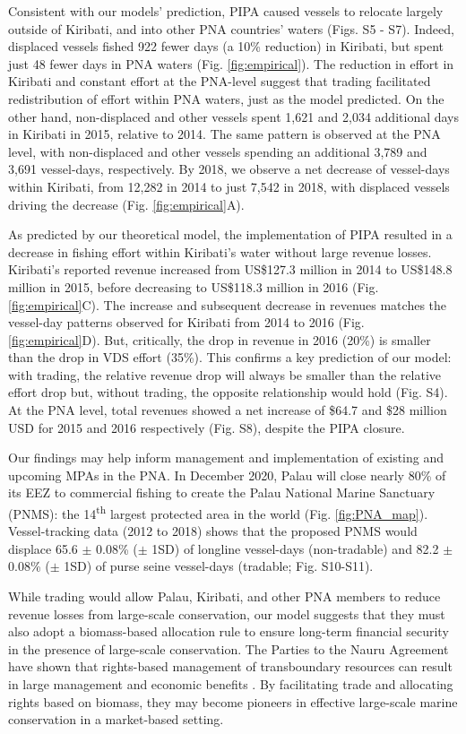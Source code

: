 \documentclass[12pt]{article}
\begin{document}
Consistent with our models' prediction, PIPA caused vessels to relocate largely outside of Kiribati, and into other PNA countries' waters (Figs. S5 - S7). Indeed, displaced vessels fished 922 fewer days (a 10\% reduction) in Kiribati, but spent just 48 fewer days in PNA waters (Fig. \ref{fig:empirical}).  The reduction in effort in Kiribati and constant effort at the PNA-level suggest that trading facilitated redistribution of effort within PNA waters, just as the model predicted. On the other hand, non-displaced and other vessels spent 1,621 and 2,034 additional days in Kiribati in 2015, relative to 2014. The same pattern is observed at the PNA level, with non-displaced and other vessels spending an additional 3,789 and 3,691 vessel-days, respectively. By 2018, we observe a net decrease of vessel-days within Kiribati, from 12,282 in 2014 to just 7,542 in 2018, with displaced vessels driving the decrease (Fig. \ref{fig:empirical}A).

As predicted by our theoretical model, the implementation of PIPA resulted in a decrease in fishing effort within Kiribati's water without large revenue losses. Kiribati's reported revenue increased from US\$127.3 million in 2014 to US\$148.8 million in 2015, before decreasing to US\$118.3 million in 2016 (Fig. \ref{fig:empirical}C). The increase and subsequent decrease in revenues matches the vessel-day patterns observed for Kiribati from 2014 to 2016 (Fig. \ref{fig:empirical}D). But, critically, the drop in revenue in 2016 (20\%) is smaller than the drop in VDS effort (35\%). This confirms a key prediction of our model: with trading, the relative revenue drop will always be smaller than the relative effort drop but, without trading, the opposite relationship would hold (Fig. S4). At the PNA level, total revenues showed a net increase of \$64.7 and \$28 million USD for 2015 and 2016 respectively (Fig. S8), despite the PIPA closure.

Our findings may help inform management and implementation of existing and upcoming MPAs in the PNA. In December 2020, Palau will close nearly 80\% of its EEZ to commercial fishing to create the Palau National Marine Sanctuary (PNMS): the 14\textsuperscript{th} largest protected area in the world (Fig. \ref{fig:PNA_map}). Vessel-tracking data (2012 to 2018) shows that the proposed PNMS would displace 65.6 $\pm$ 0.08\% ($\pm$ 1SD) of longline vessel-days (non-tradable) and 82.2 $\pm$ 0.08\% ($\pm$ 1SD) of purse seine vessel-days (tradable; Fig. S10-S11).

While trading would allow Palau, Kiribati, and other PNA members to reduce revenue losses from large-scale conservation, our model suggests that they must also adopt a biomass-based allocation rule to ensure long-term financial security in the presence of large-scale conservation. The Parties to the Nauru Agreement have shown that rights-based management of transboundary resources can result in large management and economic benefits \cite{havice_2013,aqorau_2018}. By facilitating trade and allocating rights based on biomass, they may become pioneers in effective large-scale marine conservation in a market-based setting.
\end{document}
